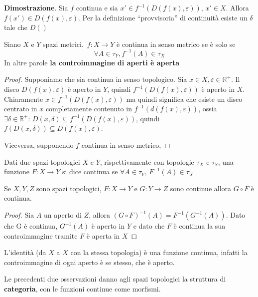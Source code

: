 \textbf{Dimostrazione}. Sia \(f\) continua e sia \(x' \in f^{-1}(D(f(x),
\varepsilon))\), \(x' \in X\). Allora \(f(x') \in D(f(x), \varepsilon)\). Per la
definizione ``provvisoria'' di continuità esiste un \(\delta\) tale che \(D()\) 

\begin{proposition}
    Siano \(X\) e \(Y\) spazi metrici.\ \(f: X \to  Y\) è continua in senso metrico se è solo se 
    \[
        \forall A \in \tau_Y, f^{-1}(A) \in \tau_X
    \]
    In altre parole \textbf{la controimmagine di aperti è aperta}
\end{proposition}
\begin{proof}
    Supponiamo che sia continua in senso topologico. Sia \(x \in X, \varepsilon
    \in \mathbb{R}^{+}\). Il disco \(D(f(x), \varepsilon)\) è aperto in \(Y\),
    quindi \(f^{-1}(D(f(x), \varepsilon))\) è aperto in \(X\). Chiaramente \(x
    \in f^{-1}(D(f(x), \varepsilon))\) ma quindi significa che esiste un disco
    centrato in \(x\) completamente contenuto in \(f^{-1}(d(f(x),
    \varepsilon))\), ossia \(\exists \delta \in \mathbb{R}^{+}:\,D(x, \delta)
    \subseteq f^{-1}(D(f(x), \varepsilon))\), quindi \(f(D(x, \delta)) \subseteq
    D(f(x), \varepsilon)\).

    Viceversa, supponendo \(f\) continua in senso metrico, 
\end{proof}

\begin{definition}
    Dati due spazi topologici \(X\) e \(Y\), rispettivamente con topologie
    \(\tau_X\) e \(\tau_Y\), una funzione \(F: X \to  Y\) si
    dice continua se \(\forall A \in \tau_Y,\, F^{-1}(A) \in \tau_X\) 
\end{definition}

\begin{remark}
    Se \(X, Y, Z\) sono spazi topologici, \(F: X \to  Y\) e \(G: Y \to  Z\) sono
    continue allora \(G \circ F\) è continua.
\end{remark}
\begin{proof}
    Sia \(A\) un aperto di \(Z\), allora \((G \circ F)^{-1}(A) =
    F^{-1}(G^{-1}(A))\). Dato che G è continua, \(G^{-1}(A)\) è aperto in \(Y\)
    e dato che \(F\) è continua la sua controimmagine tramite \(F\) è aperta in
    \(X\)
\end{proof}
\begin{remark}
    L'identità (da \(X\) a \(X\) con la stessa topologia) è una funzione continua, infatti la controimmagine di ogni aperto
    è se stesso, che è aperto.
\end{remark}
Le precedenti due osservazioni danno agli spazi topologici la struttura di
\textbf{categoria}, con le funzioni continue come morfismi.

